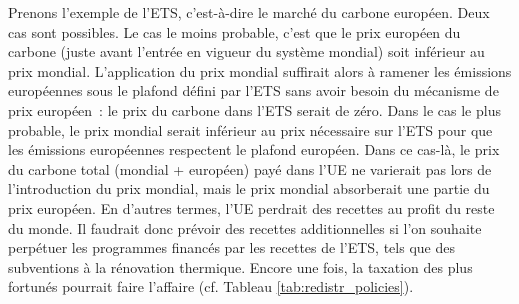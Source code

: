 \documentclass[a5paper,french,openany]{memoir}
\begin{document}
Prenons l'exemple de l'ETS, c'est-à-dire le marché du carbone européen. Deux cas sont possibles. Le cas le moins probable, c'est que le prix européen du carbone (juste avant l'entrée en vigueur du système mondial) soit inférieur au prix mondial. L'application du prix mondial suffirait alors à ramener les émissions européennes sous le plafond défini par l'ETS sans avoir besoin du mécanisme de prix européen~: le prix du carbone dans l'ETS serait de zéro. Dans le cas le plus probable, le prix mondial serait inférieur au prix nécessaire sur l'ETS pour que les émissions européennes respectent le plafond européen. Dans ce cas-là, le prix du carbone total (mondial + européen) payé dans l'UE ne varierait pas lors de l'introduction du prix mondial, mais le prix mondial absorberait une partie du prix européen. En d'autres termes, l'UE perdrait des recettes au profit du reste du monde. Il faudrait donc prévoir des recettes additionnelles si l'on souhaite perpétuer les programmes financés par les recettes de l'ETS, tels que des subventions à la rénovation thermique. Encore une fois, la taxation des plus fortunés pourrait faire l'affaire (cf. Tableau \ref{tab:redistr_policies}).





\end{document}
